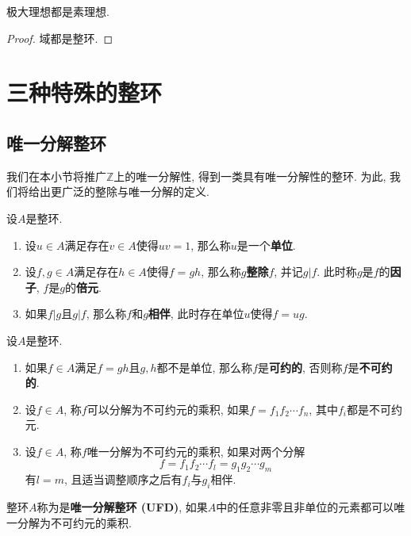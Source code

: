 \begin{col}\label{maximal implies prime}
    极大理想都是素理想.
\end{col}
\begin{proof}
    域都是整环.
\end{proof}

\section{三种特殊的整环}

\subsection{唯一分解整环}

我们在本小节将推广$\mathbb{Z}$上的唯一分解性, 得到一类具有唯一分解性的整环.
为此, 我们将给出更广泛的整除与唯一分解的定义.

\begin{defn}设$A$是整环.
    \begin{enumerate}[(1)]
        \item 设$u\in A$满足存在$v\in A$使得$uv=1$, 那么称$u$是一个\textbf{单位}.
        \item 设$f,g\in A$满足存在$h\in A$使得$f=gh$, 那么称$g$\textbf{整除}$f$, 并记$g|f$. 此时称$g$是$f$的\textbf{因子}, $f$是$g$的\textbf{倍元}.
        \item 如果$f|g$且$g|f$, 那么称$f$和$g$\textbf{相伴}, 此时存在单位$u$使得$f=ug$.
    \end{enumerate}
\end{defn}

\begin{defn}
    设$A$是整环.
    \begin{enumerate}[(1)]
        \item 如果$f\in A$满足$f=gh$且$g,h$都不是单位, 那么称$f$是\textbf{可约的}, 否则称$f$是\textbf{不可约的}.
        \item 设$f\in A$, 称$f$可以分解为不可约元的乘积, 如果$f=f_1f_2\cdots f_n$, 其中$f_i$都是不可约元.
        \item 设$f\in A$, 称$f$唯一分解为不可约元的乘积, 如果对两个分解
        \[f=f_1f_2\cdots f_l=g_1g_2\cdots g_m\]
        有$l=m$, 且适当调整顺序之后有$f_i$与$g_i$相伴.
    \end{enumerate}
\end{defn}

\begin{defn}
    整环$A$称为是\textbf{唯一分解整环 (UFD)}, 如果$A$中的任意非零且非单位的元素都可以唯一分解为不可约元的乘积.
\end{defn}

